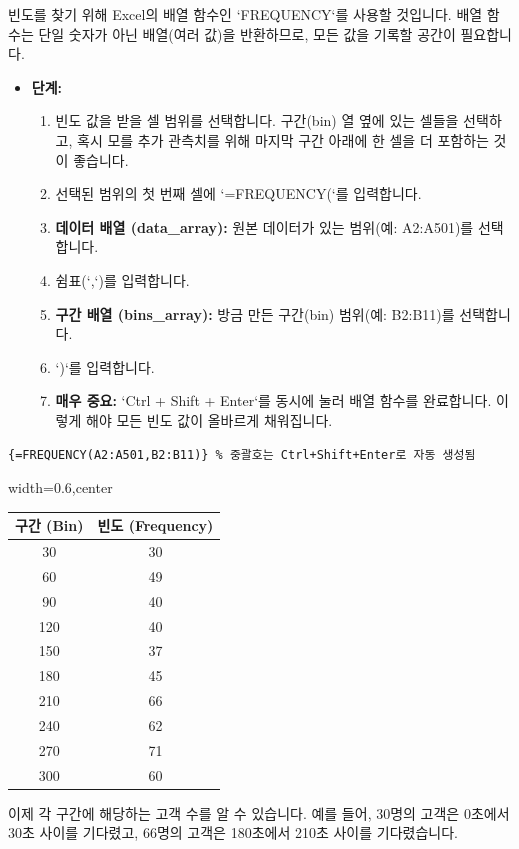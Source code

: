 \documentclass[11pt,a4paper]{article}
\begin{document}
\begin{tcolorbox}[title={빈도 계산 (Calculating Frequency)}]
빈도를 찾기 위해 Excel의 배열 함수인 `FREQUENCY`를 사용할 것입니다. 배열 함수는 단일 숫자가 아닌 배열(여러 값)을 반환하므로, 모든 값을 기록할 공간이 필요합니다.

\begin{itemize}
    \item \textbf{단계:}
    \begin{enumerate}
        \item 빈도 값을 받을 셀 범위를 선택합니다. 구간(bin) 열 옆에 있는 셀들을 선택하고, 혹시 모를 추가 관측치를 위해 마지막 구간 아래에 한 셀을 더 포함하는 것이 좋습니다.
        \item 선택된 범위의 첫 번째 셀에 `=FREQUENCY(`를 입력합니다.
        \item \textbf{데이터 배열 (data\_array):} 원본 데이터가 있는 범위(예: A2:A501)를 선택합니다.
        \item 쉼표(`,`)를 입력합니다.
        \item \textbf{구간 배열 (bins\_array):} 방금 만든 구간(bin) 범위(예: B2:B11)를 선택합니다.
        \item `)`를 입력합니다.
        \item \textbf{매우 중요:} `Ctrl + Shift + Enter`를 동시에 눌러 배열 함수를 완료합니다. 이렇게 해야 모든 빈도 값이 올바르게 채워집니다.
    \end{enumerate}
\end{itemize}

\begin{lstlisting}[caption={Excel FREQUENCY 함수 사용 예시}, label={lst:excel_frequency}]
{=FREQUENCY(A2:A501,B2:B11)} % 중괄호는 Ctrl+Shift+Enter로 자동 생성됨
\end{lstlisting}

\begin{center}
\label{tab:excel_frequency_results}
\begin{adjustbox}{width=0.6\textwidth,center}
\begin{tabular}{cc}
\toprule
\textbf{구간 (Bin)} & \textbf{빈도 (Frequency)} \\
\midrule
30 & 30 \\
60 & 49 \\
90 & 40 \\
120 & 40 \\
150 & 37 \\
180 & 45 \\
210 & 66 \\
240 & 62 \\
270 & 71 \\
300 & 60 \\
\bottomrule
\end{tabular}
\end{adjustbox}
\end{center}
이제 각 구간에 해당하는 고객 수를 알 수 있습니다. 예를 들어, 30명의 고객은 0초에서 30초 사이를 기다렸고, 66명의 고객은 180초에서 210초 사이를 기다렸습니다.
\end{tcolorbox}
\end{document}
